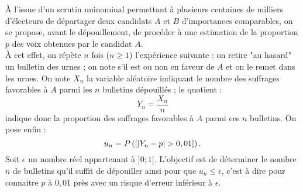 \documentclass[11pt]{article}%
\begin{document}
À l'issue d'un scrutin uninominal permettant à plusieurs centaines de
milliers d'électeurs de départager deux candidats $A$ et $B$
d'importances
comparables, on se propose, avant le dépouillement, de procéder à une
estimation de la proportion $p$ des voix obtenues par le candidat
$A$.\\
À cet effet, on répète $n$ fois ($n\geq 1$) l'expérience suivante : on
retire "au hasard" un bulletin des urnes ; on note s'il est ou non en
faveur
de $A$ et on le remet dans les urnes. On note $X_{n}$ la variable
aléatoire
indiquant le nombre des suffrages favorables à $A$ parmi les $n$
bulletins dépouillés ; le quotient : 
\[
Y_{n} = \dfrac{X_{n}}{n}
\]
indique donc la proportion des suffrages favorables à $A$ parmi ces $n$
bulletins. On pose enfin : 
\[
u_{n} = P\left(\left[ { \left| Y_{n}-p\right| >0,01} \right]\right).
\]
Soit $\epsilon $ un nombre réel appartenant à $]0;1[$. L'objectif est
de déterminer le nombre $n$ de bulletins qu'il suffit de dépouiller
ainsi pour
que $u_{n}\leq \epsilon $, c'est à dire pour connaitre $p$ à $0,01$
près avec un risque d'erreur inférieur à $\epsilon $.
\end{document}
